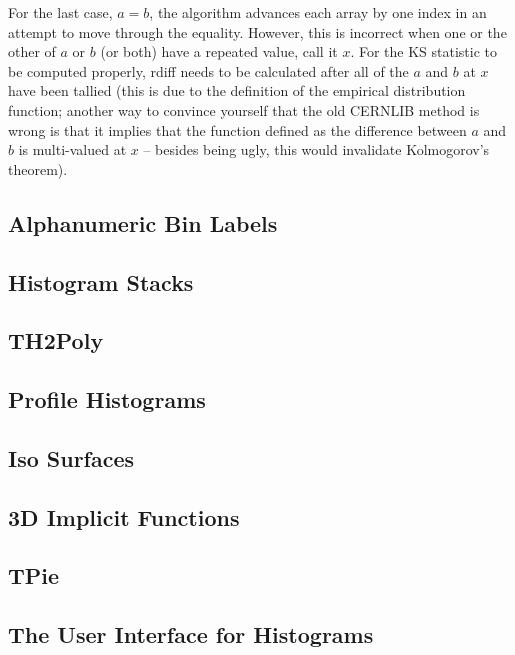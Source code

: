 \documentclass[12pt,a4paper]{article}
\begin{document}
For the last case, $a=b$, the algorithm advances each array by one index in an attempt to move through the equality. However, this is incorrect when one or the other of $a$ or $b$ (or both) have a repeated value, call it $x$. For the KS statistic to be computed properly, rdiff needs to be calculated after all of the $a$ and $b$ at $x$ have been tallied (this is due to the definition of the empirical distribution function; another way to convince yourself that the old CERNLIB method is wrong is that it implies that the function defined as the difference between $a$ and $b$ is multi-valued at $x$ – besides being ugly, this would invalidate Kolmogorov's theorem).

\subsection{Alphanumeric Bin Labels}


\subsection{Histogram Stacks}


\subsection{TH2Poly}

\subsection{Profile Histograms}

\subsection{Iso Surfaces}




\subsection{3D Implicit Functions}


\subsection{TPie}


\subsection{The User Interface for Histograms}
\end{document}
